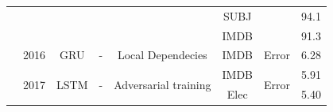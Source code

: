 \documentclass[12pt, a4paper, oneside]{report}
\begin{document}
\begin{tiny}
\begin{latin}
\begin{longtable}{|c|c|c|c|c|c|cc|}
                                                                              &                       &                                   &                                         &                                                                                                        & SUBJ                                  & \multicolumn{1}{c|}{}                                                                                                              & 94.1   \\ \cline{6-6} \cline{8-8} 
                                                                              &                       &                                   &                                         &                                                                                                        & IMDB                                  & \multicolumn{1}{c|}{}                                                                                                              & 91.3   \\ \hline
        \cite{dieng2016topicrnn}                             & 2016                  & GRU                               & -                                       & Local Dependecies                                                                                      & IMDB                                  & \multicolumn{1}{c|}{Error}                                                                                                         & 6.28   \\ \hline
        \multirow{5}{*}{\cite{miyato2017adversarial}}        & \multirow{5}{*}{2017} & \multirow{5}{*}{LSTM}             & \multirow{5}{*}{-}                      & \multirow{5}{*}{Adversarial training}                                                                  & IMDB                                  & \multicolumn{1}{c|}{\multirow{5}{*}{Error}}                                                                                        & 5.91   \\ \cline{6-6} \cline{8-8} 
                                                                              &                       &                                   &                                         &                                                                                                        & Elec                                  & \multicolumn{1}{c|}{}                                                                                                              & 5.40   \\ \cline{6-6} \cline{8-8} 

\end{longtable}
\end{latin}
\end{tiny}
\end{document}
